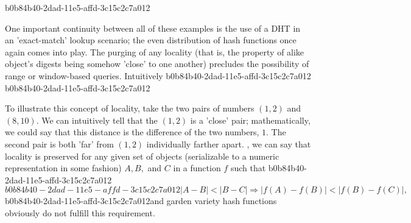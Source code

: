 \documentclass[12pt]{article}
\begin{document}
b0b84b40-2dad-11e5-affd-3c15c2c7a012\par One important continuity between all of these examples is the use of a DHT in an 'exact-match' lookup scenario; the even distribution of hash functions once again comes into play. The purging of any locality (that is, the property of alike object's digests being somehow 'close' to one another) precludes the possibility of range or window-based queries. Intuitively
b0b84b40-2dad-11e5-affd-3c15c2c7a012
b0b84b40-2dad-11e5-affd-3c15c2c7a012\par To illustrate this concept of locality, take the two pairs of numbers $(1,2)$ and $(8,10)$. We can intuitively tell that the $(1,2)$ is a 'close' pair; mathematically, we could say that this distance is the difference of the two numbers, $1$. The second pair is both 'far' from $(1,2)$ individually farther apart. , we can say that locality is preserved for any given set of objects (serializable to a numeric representation in some fashion) $A,B,$ and $C$ in a function $f$ such that
b0b84b40-2dad-11e5-affd-3c15c2c7a012\begin{equation}
b0b84b40-2dad-11e5-affd-3c15c2c7a012|A-B| < |B-C| \Rightarrow |f(A)-f(B)| < |f(B) - f(C)|,
\end{equation}
b0b84b40-2dad-11e5-affd-3c15c2c7a012and garden variety hash functions obviously do not fulfill this requirement.

\printbibliography
\end{document}
